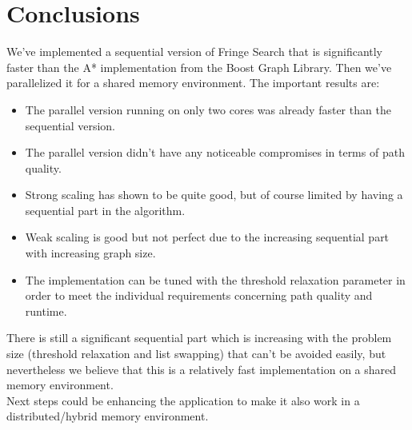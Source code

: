 \documentclass[letterpaper]{article}
\begin{document}
\section{Conclusions}

We've implemented a sequential version of Fringe Search that is significantly faster than the A* implementation from the Boost Graph Library. Then we've parallelized it for a shared memory environment. The important results are:
\begin{itemize}
\item The parallel version running on only two cores was already faster than the sequential version.
\item The parallel version didn't have any noticeable compromises in terms of path quality.
\item Strong scaling has shown to be quite good, but of course limited by having a sequential part in the algorithm.
\item Weak scaling is good but not perfect due to the increasing sequential part with increasing graph size.
\item The implementation can be tuned with the threshold relaxation parameter in order to meet the individual requirements concerning path quality and runtime.
\end{itemize}
There is still a significant sequential part which is increasing with the problem size (threshold relaxation and list swapping) that can't be avoided easily, but nevertheless we believe that this is a relatively fast implementation on a shared memory environment.\\
Next steps could be enhancing the application to make it also work in a distributed/hybrid memory environment.





\end{document}
